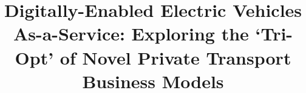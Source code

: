 \documentclass[journal]{IEEEtran}
\begin{document}
%
\title{Digitally-Enabled Electric Vehicles As-a-Service: Exploring the
  `Tri-Opt' of Novel Private Transport Business Models}
%
%
%


% 
%
\end{document}
